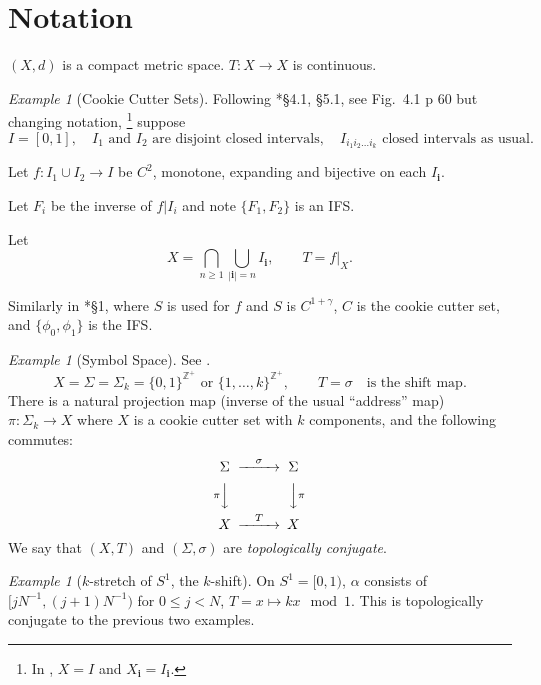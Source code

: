 \documentclass[a4paper]{amsart}
\theoremstyle{plain}
\theoremstyle{definition}
\theoremstyle{remark}
\newtheorem{example}[theorem]{Example}
\begin{document}
\section{\textbf{Notation}} 
$ (X,d) $ is a compact metric space.  $ T:X\to X $ is continuous.

\begin{example}[Cookie Cutter Sets]  Following \cite{Fal}*{\S 4.1, \S5.1},
see Fig.\ 4.1 p 60  but changing notation,%
\footnote{In \cite{Fal}, $ X= I $ and $ X_{\boldsymbol{i}}  = I _{\boldsymbol{i}}  $.}
suppose 
\[
I = [0,1],\quad   I_1\text{ and } I_2 \text{ are disjoint closed intervals}, 
\quad I_{i_1i_2 \dots i_k} \text{ closed intervals as usual}.
\]
 
Let $ f:I_1\cup I_2 \to I $ be $ C^2 $, monotone, expanding and bijective on each $ I_{\boldsymbol{i}}  $.

Let $ F_i $ be the inverse of $ f|{I_i} $ and note $ \{F_1,F_2\} $ is an IFS.

\medskip
Let 
\[ 
X = \bigcap_{n\geq 1}\bigcup_{|{\boldsymbol{i}}|=n}   I _{\boldsymbol{i}}       , \qquad T = f|_X  .  
\]

\medskip  Similarly in \cite{Bed}*{\S 1}, where $ S $ is used for $ f $ and  $ S $ is $ C^{1+ \gamma} $,   $ C $ is the cookie cutter set, and $ \{\phi_0, \phi_1\} $ is the IFS.
\end{example}


\begin{example}[Symbol Space]  See \cite{Bed}.  
\[
X = \Sigma = \Sigma_k = \{0,1\}^{\mathbb{Z} ^+} \text{ or }  \{1,\dots, k\}^{\mathbb{Z} ^+} ,\qquad 
T = \sigma \quad \text{is the shift map}.
\]
There is a natural projection map (inverse of the usual ``address'' map)   $ \pi :\Sigma_k \to X $ where $ X $ is a cookie cutter set with $ k $ components, and the following commutes:
\[
\begin{CD}
\Sigma @>\sigma>> \Sigma \\
@V\pi VV                    @VV\pi V \\
X          @>T>>                   X
\end{CD}
\]
We say that $ (X,T)  $ and $ (\Sigma, \sigma) $ are \emph{topologically conjugate}.
\end{example}

\begin{example}[$ k $-stretch of $ S^1 $, the $ k $-shift]
On $ S^1= [0,1)$, $ \alpha $ consists of  $ [jN^{-1}, (j+1) N^{-1} ) $ for $ 0\leq j <N $, $ T = x \mapsto kx \mod 1$. This is topologically conjugate to the previous two examples.
\end{example}
\end{document}
